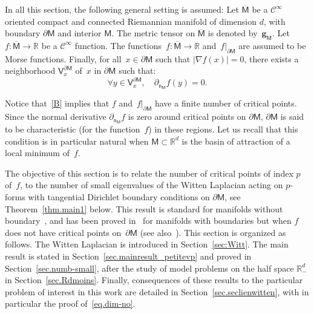\documentclass[JEP,XML,SOM,Unicode,NoEqCountersInSection,NoFloatCountersInSection,published]{cedram}
\newcommand{\mbf}[1]{\mathbf{#1}}
\let\pa\partial
\theoremstyle{plain}
\theoremstyle{definition}
\newenvironment{manualassumption}[1]{%
\renewcommand\themanualassumptioninner{#1}%
\manualassumptioninner}{\endmanualassumptioninner}
\begin{document}
In all this section, the following general setting is assumed:
\begin{manualassumption}{$(\mathsf M$-$f)$}\label{B}
Let $\overline{\mathsf M}$ be a $\mathcal C^{\infty}$ oriented compact
and connected Riemannian manifold of dimension $d$, with boundary
$\partial \mathsf M$ and interior $\mathsf M$. The metric tensor on
$\overline{\mathsf M}$ is denoted by~$\mbf g_{\mathsf M}$. Let $f:
\overline{\mathsf M} \to \mathbb R$ be a $\mathcal C^{\infty}$
function. The functions~$f: \overline{\mathsf M} \to \mathbb R$
and~$f|_{\partial \mathsf M}$ are assumed to be Morse functions. Finally, for all~$x\in \pa \mathsf M$ such that $\vert \nabla f(x)\vert =0$, there exists a neighborhood $\mathsf V_x^{\pa \mathsf M}$ of~$x$ in $\pa \mathsf M$ such that:\vspace*{-3pt}
\[
\forall y\in \mathsf V_x^{\pa \mathsf M}, \quad \partial_{\mathsf n_{ \mathsf M}}f(y)=0.
\]
\end{manualassumption}

Notice that~\ref{B} implies that $f$ and~$f|_{\partial \mathsf M}$ have a finite number of
critical points. Since the normal derivative $\partial_{\mathsf n_{ \mathsf M}}f$ is zero around critical
points on $\pa \mathsf M$, $\pa \mathsf M$ is said
to be characteristic (for the function~$f$) in these regions. Let us
recall that this condition is in particular natural when $\mathsf M\subset \mathbb R^d$ is the basin of attraction of a local minimum of~$f$.

The objective of this section is to relate the number of critical
points of index $p$ of~$f$, to the number of small
eigenvalues of the Witten Laplacian acting on $p$-forms with
tangential Dirichlet boundary conditions on $\pa \mathsf M$, see
Theorem~\ref{thm.main1} below. This result is standard for manifolds
without
boundary~\cite{witten-82,helffer-sjostrand-85,simon1983semiclassical,herau-hitrick-sjostrand-11},
and has been proved in~\cite[Th.\,3.2.3]{helffer-nier-06} for manifolds with
boundaries but when $f$ does not have critical points on~$\pa \mathsf M$ (see
also~\cite{laudenbach2011morse,le-peutrec-10}). This section is organized
as follows. The Witten Laplacian is introduced in
Section~\ref{sec:Witt}. The main result is stated in
Section~\ref{sec.mainresult_petitevp} and proved in
Section~\ref{sec.numb-small}, after the study of model problems on the
half space $\mathbb R^d_-$ in Section~\ref{sec.Rdmoins}. Finally, consequences of these results
to the particular problem of interest in this work are detailed in
Section~\ref{sec.seclienwitten}, with in particular the proof of~\eqref{eq.dim-no}.
\end{document}

